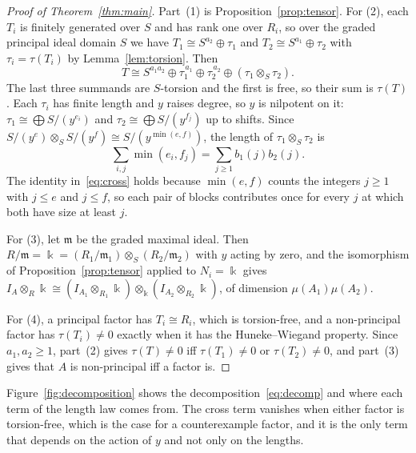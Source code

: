 \documentclass[11pt]{article}
\theoremstyle{definition}
\theoremstyle{remark}
\newcommand{\kk}{\Bbbk}
\newcommand{\tor}{\tau}
\begin{document}
\begin{proof}[Proof of Theorem~\ref{thm:main}]
Part~(1) is Proposition~\ref{prop:tensor}. For (2), each $T_i$ is finitely generated over $S$ and has
rank one over $R_i$, so over the graded principal ideal domain $S$ we have
$T_1\cong S^{a_2}\oplus\tor_1$ and $T_2\cong S^{a_1}\oplus\tor_2$ with $\tor_i=\tor(T_i)$ by
Lemma~\ref{lem:torsion}. Then
\begin{equation}\label{eq:decomp}
T\cong S^{a_1a_2}\oplus\tor_1^{\,a_1}\oplus\tor_2^{\,a_2}\oplus(\tor_1\otimes_S\tor_2).
\end{equation}
The last three summands are $S$-torsion and the first is free, so their sum is $\tor(T)$. Each $\tor_i$
has finite length and $y$ raises degree, so $y$ is nilpotent on it:
$\tor_1\cong\bigoplus S/(y^{e_i})$ and $\tor_2\cong\bigoplus S/(y^{f_j})$ up to shifts. Since
$S/(y^e)\otimes_SS/(y^f)\cong S/(y^{\min(e,f)})$, the length of $\tor_1\otimes_S\tor_2$ is
\begin{equation}\label{eq:cross}
\sum_{i,j}\min(e_i,f_j)=\sum_{j\ge1}b_1(j)b_2(j).
\end{equation}
The identity in~\eqref{eq:cross} holds because $\min(e,f)$ counts the integers $j\ge1$ with $j\le e$ and $j\le f$,
so each pair of blocks contributes once for every $j$ at which both have size at least $j$.

For (3), let $\mathfrak m$ be the graded maximal ideal. Then $R/\mathfrak m=\kk=(R_1/\mathfrak m_1)\otimes_S(R_2/\mathfrak m_2)$
with $y$ acting by zero, and the isomorphism of Proposition~\ref{prop:tensor} applied to $N_i=\kk$ gives
$I_A\otimes_R\kk\cong(I_{A_1}\otimes_{R_1}\kk)\otimes_\kk(I_{A_2}\otimes_{R_2}\kk)$, of dimension
$\mu(A_1)\mu(A_2)$.

For (4), a principal factor has $T_i\cong R_i$, which is torsion-free, and a non-principal factor has
$\tor(T_i)\ne0$ exactly when it has the Huneke--Wiegand property. Since $a_1,a_2\ge1$, part~(2) gives
$\tor(T)\ne0$ iff $\tor(T_1)\ne0$ or $\tor(T_2)\ne0$, and part~(3) gives that $A$ is non-principal iff a
factor is.
\end{proof}

Figure~\ref{fig:decomposition} shows the decomposition~\eqref{eq:decomp} and where each term of the length law
comes from. The cross term vanishes when either factor is torsion-free, which is the case for a counterexample
factor, and it is the only term that depends on the action of $y$ and not only on the lengths.
\end{document}
